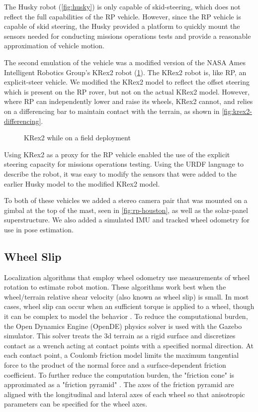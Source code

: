 \documentclass[twocolumn,letterpaper]{IEEEAerospaceCLS}  %
\begin{document}
The Husky robot (\cref{fig:husky}) is only capable of skid-steering, which does not reflect the full capabilities of the RP vehicle.  However, since the RP vehicle is capable of skid steering, the Husky provided a platform to quickly mount the sensors needed for conducting missions operations tests and provide a reasonable approximation of vehicle motion.  

The second emulation of the vehicle was a modified version of the NASA Ames Intelligent Robotics Group's KRex2 robot (\cref{fig:krex2}).  The KRex2 robot is, like RP, an explicit-steer vehicle.  We modified the KRex2 model to reflect the offset steering which is present on the RP rover, but not on the actual KRex2 model.  However, where RP can independently lower and raise its wheels, KRex2 cannot, and relies on a differencing bar to maintain contact with the terrain, as shown in \cref{fig:krex2-differencing}.    

\begin{figure}[htp]
\caption{KRex2 while on a field deployment \label{fig:krex2}}
\end{figure}

Using KRex2 as a proxy for the RP vehicle enabled the use of the explicit steering capacity for missions operations testing.  Using the URDF language to describe the robot, it was easy to modify the sensors that were added to the earlier Husky model to the modified KRex2 model.  


To both of these vehicles we added a stereo camera pair that was mounted on a gimbal at the top of the mast, seen in \cref{fig:rp-houston}, as well as the solar-panel superstructure. We also added a simulated IMU and tracked wheel odometry for use in pose estimation.  

\subsection{Wheel Slip}
Localization algorithms that employ wheel odometry use measurements of wheel rotation to estimate robot motion.
These algorithms work best when the wheel/terrain relative shear velocity (also known as wheel slip) is small.
In most cases, wheel slip can occur when an sufficient torque is applied to a wheel,
though it can be complex to model the behavior \cite{yoshida1013712}.
To reduce the computational burden, the Open Dynamics Engine (OpenDE) physics solver is used with the Gazebo simulator.
This solver treats the 3d terrain as a rigid surface and discretizes contact as a wrench
acting at contact points with a specified normal direction.
At each contact point, a Coulomb friction model limits the maximum tangential force
to the product of the normal force and a surface-dependent friction coefficient.
To further reduce the computation burden, the "friction cone" is approximated
as a "friction pyramid" \cite{hsuPeters2014}.
The axes of the friction pyramid are aligned with the longitudinal and lateral axes of each wheel
so that anisotropic parameters can be specified for the wheel axes.
\end{document}
